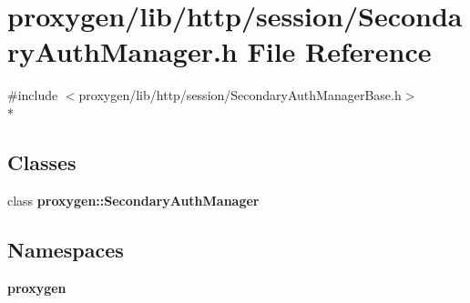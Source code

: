 \section{proxygen/lib/http/session/\+Secondary\+Auth\+Manager.h File Reference}
\label{SecondaryAuthManager_8h}
{\ttfamily \#include $<$proxygen/lib/http/session/\+Secondary\+Auth\+Manager\+Base.\+h$>$}\\*
\subsection*{Classes}
\begin{DoxyCompactItemize}
\item 
class {\bf proxygen\+::\+Secondary\+Auth\+Manager}
\end{DoxyCompactItemize}
\subsection*{Namespaces}
\begin{DoxyCompactItemize}
\item 
 {\bf proxygen}
\end{DoxyCompactItemize}
